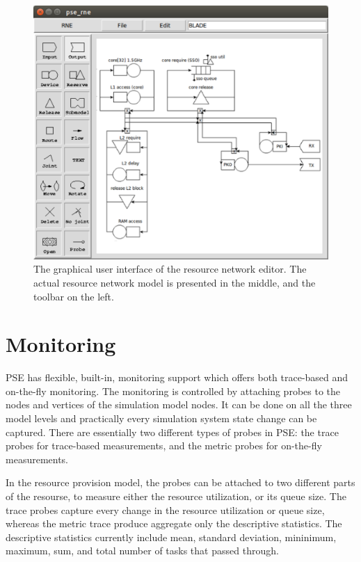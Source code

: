 \begin{figure}[]
  \begin{center}
    \includegraphics[width=\textwidth]{images/rne-example.pdf}
    \caption{The graphical user interface of the resource network editor. The actual resource network model is presented in the middle, and the toolbar on the left.}
    \label{fig:rne-example}
  \end{center}
\end{figure}

\section{Monitoring}

PSE has flexible, built-in, monitoring support which offers both trace-based and on-the-fly monitoring. The monitoring is controlled by attaching probes to the nodes and vertices of the simulation model nodes. It can be done on all the three model levels and practically every simulation system state change can be captured. There are essentially two different types of probes in PSE: the trace probes for trace-based measurements, and the metric probes for on-the-fly measurements.

In the resource provision model, the probes can be attached to two different parts of the resourse, to measure either the resource utilization, or its queue size. The trace probes capture every change in the resource utilization or queue size, whereas the metric trace produce aggregate only the descriptive statistics. The descriptive statistics currently include mean, standard deviation, mininimum, maximum, sum, and total number of tasks that passed through.

